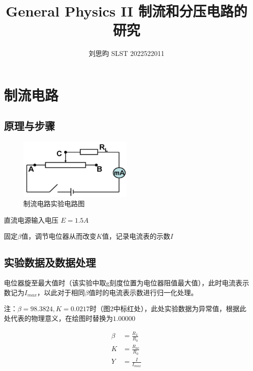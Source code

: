\documentclass{article}
\author{刘思昀 SLST 2022522011}
\title{General Physics II 制流和分压电路的研究}
\begin{document}
\date{}

\maketitle

\section{制流电路}
\subsection{原理与步骤}

\begin{figure}[htbp]
    \centering
    \includegraphics[width=0.5\textwidth]{current-control.png}
    \caption{制流电路实验电路图}
\end{figure}

直流电源输入电压 $E = 1.5 A$

固定$\beta$值，调节电位器从而改变$K$值，记录电流表的示数$I$

\subsection{实验数据及数据处理}
电位器旋至最大值时（该实验中取g刻度位置为电位器阻值最大值），此时电流表示数记为$I_{max}$，以此对于相同$\beta$值时的电流表示数进行归一化处理。

注：$\beta = 98.3824, K = 0.0217$时（图2中标红处），此处实验数据为异常值，根据此处代表的物理意义，在绘图时替换为$1.00000$

\begin{align*}
    \beta &= \frac{R_L}{R_0} \\
    K &= \frac{R_{ac}}{R_0} \\
    Y &= \frac{I}{I_{max}}
\end{align*}
\end{document}
